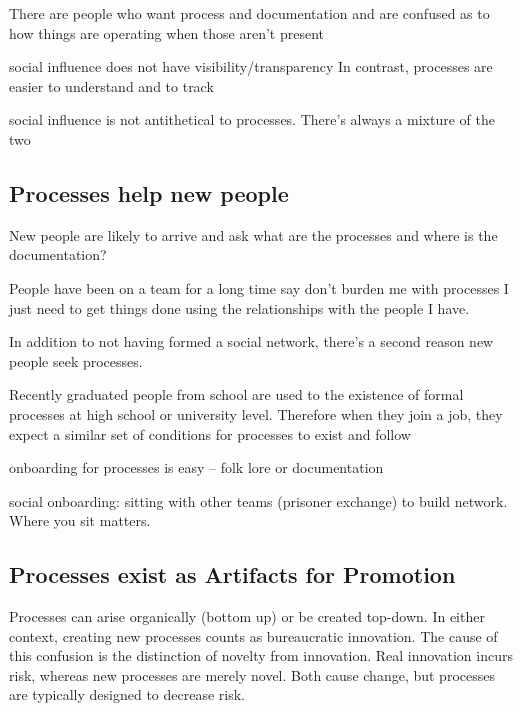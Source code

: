 There are people who want process and documentation and are confused as to how things are operating when those aren't present

social influence does not have visibility/transparency
In contrast, processes are easier to understand and to track

social influence is not antithetical to processes. There's always a mixture of the two


\subsection*{Processes help new people}

New people are likely to arrive and ask what are the processes and where is the documentation?

People have been on a team for a long time say don't burden me with processes I just need to get things done using the relationships with the people I have.

In addition to not having formed a social network, there's a second reason new people seek processes.

Recently graduated people from school are used to the existence of formal processes at high school or university level. Therefore when they join a job, they expect a similar set of conditions for processes to exist and follow

onboarding for processes is easy -- folk lore or documentation

social onboarding: sitting with other teams (prisoner exchange) to build network.
Where you sit matters.

\subsection*{Processes exist as Artifacts for Promotion}

Processes can arise organically (bottom up) or be created top-down. In either context, creating new processes counts as bureaucratic innovation. The cause of this confusion is the distinction of novelty from innovation. Real innovation incurs risk, whereas new processes are merely novel. Both cause change, but processes are typically designed to decrease risk. 

